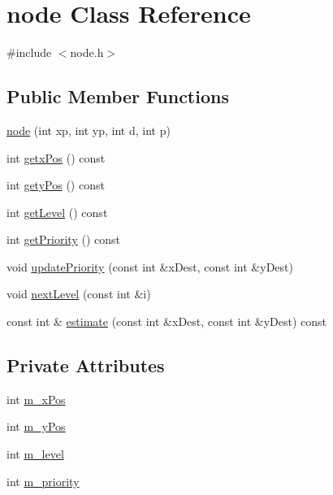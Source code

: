 \hypertarget{classnode}{
\section{node Class Reference}
\label{classnode}
}


{\ttfamily \#include $<$node.h$>$}

\subsection*{Public Member Functions}
\begin{DoxyCompactItemize}
\item 
\hyperlink{classnode_a802701cab6639590de6f16136184c2de}{node} (int xp, int yp, int d, int p)
\item 
int \hyperlink{classnode_a419596f9858640ee6d04b69b616b7cd2}{getxPos} () const 
\item 
int \hyperlink{classnode_a3b5d135d5e5eac9211a9478ea9803ae7}{getyPos} () const 
\item 
int \hyperlink{classnode_a78c66d7badca074b6b34ec7eca4ab106}{getLevel} () const 
\item 
int \hyperlink{classnode_afebf5ef7f94fa7554890f03e97686de7}{getPriority} () const 
\item 
void \hyperlink{classnode_ad51b92de008bd5107a7b55cc61fc497b}{updatePriority} (const int \&xDest, const int \&yDest)
\item 
void \hyperlink{classnode_a04a186013c42fb942b6da90d2e98d4ed}{nextLevel} (const int \&i)
\item 
const int \& \hyperlink{classnode_a311569dff2e77c4c7953107333960a5d}{estimate} (const int \&xDest, const int \&yDest) const 
\end{DoxyCompactItemize}
\subsection*{Private Attributes}
\begin{DoxyCompactItemize}
\item 
int \hyperlink{classnode_a377c0cd9462931487ee9a80917c0071a}{m\_\-xPos}
\item 
int \hyperlink{classnode_a848f211f150104a88c1e072c4716f169}{m\_\-yPos}
\item 
int \hyperlink{classnode_ab68076929ea68209db1fdd25b7530515}{m\_\-level}
\item 
int \hyperlink{classnode_ae1c537b9584f180d868a0ddf1b64526c}{m\_\-priority}
\end{DoxyCompactItemize}


